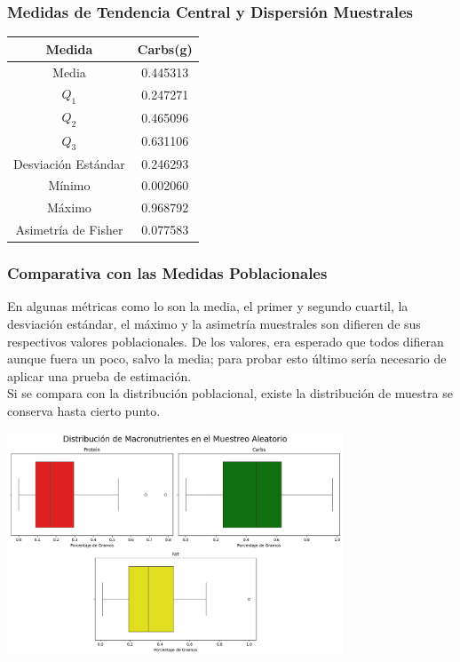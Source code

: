 \documentclass[12pt,a4paper]{article}
\begin{document}
    \subsubsection{Medidas de Tendencia Central y Dispersión Muestrales}
        \begin{center}
            \begin{tabular}{|c|c|}
                \hline
                Medida & Carbs(g) \\
                \hline
                Media & 0.445313 \\
                $Q_1$ & 0.247271 \\
                $Q_2$ & 0.465096 \\
                $Q_3$ & 0.631106 \\
                Desviación Estándar & 0.246293 \\
                Mínimo & 0.002060 \\
                Máximo & 0.968792 \\
                Asimetría de Fisher & 0.077583 \\
                \hline
                \end{tabular}
        \end{center}
    
    \subsubsection{Comparativa con las Medidas Poblacionales}
        En algunas métricas como lo son la media, el primer y segundo cuartil, 
        la desviación estándar, el máximo y la asimetría muestrales son 
        difieren de sus respectivos valores poblacionales. De los valores, era 
        esperado que todos difieran aunque fuera un poco, salvo la media; para 
        probar esto último sería necesario de aplicar una prueba de estimación.\\
        Si se compara con la distribución poblacional, existe la distribución de 
        muestra se conserva hasta cierto punto.
        \begin{center}
            \includegraphics[width=0.75\textwidth]{Resources/3_01_plot_01.png}
        \end{center}
    
\end{document}
